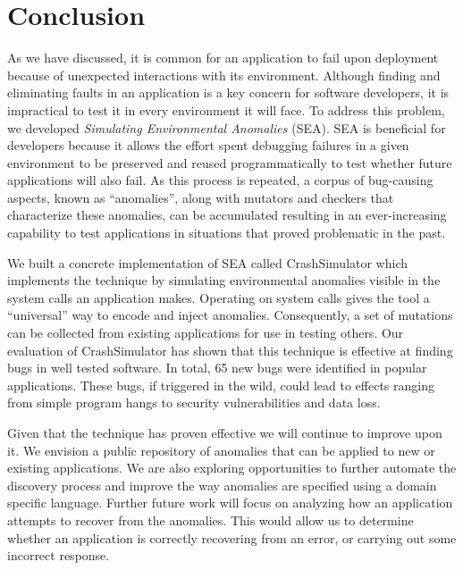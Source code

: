 \section{Conclusion}
\label{SEC:conclusion}

As we have discussed,
it is common for an application
to fail upon deployment because of unexpected interactions
with its environment.
Although finding and eliminating
faults in an application is a key concern for software developers, it is
impractical to test it in every environment it will face.
To address this problem, we developed \textit{Simulating Environmental
Anomalies} (SEA).
SEA is beneficial for developers because it allows
the effort spent debugging failures in a given environment
to be preserved and reused programmatically to test whether
future applications will also fail.
As this process is repeated,
a corpus of bug-causing aspects,
known as ``anomalies'',
along with mutators and checkers that characterize these anomalies,
can be accumulated
resulting in an ever-increasing capability
to test applications in situations
that proved problematic in the past.

We built a concrete implementation of SEA
called CrashSimulator which implements
the technique by simulating environmental
anomalies visible in the system calls an application makes.
Operating on system calls gives the tool a ``universal'' way to
encode and inject anomalies. Consequently, a set of mutations can be
collected from existing applications for use in testing others.
Our evaluation of CrashSimulator
has shown that this technique is
effective at finding bugs in well tested software.
In total,
65 new bugs were identified in popular applications.
These bugs, if triggered in the wild,
could lead to effects ranging from simple program hangs
to security vulnerabilities and data loss.

Given that the technique has
proven effective we will continue to improve upon it.
We envision a public repository of anomalies
that can be applied to new or existing applications.
We are also exploring
opportunities to further automate the discovery process
and improve the way anomalies are specified using a
domain specific language.
Further future work
will focus on analyzing how an
application attempts
to recover from the anomalies.  This would allow
us to determine whether
an application is correctly recovering
from an error, or carrying out some incorrect response.
